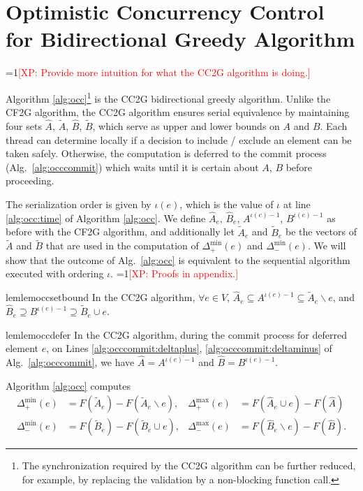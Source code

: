 \documentclass{article} %
\newcommand{\hogwild}{CF2G}
\newcommand{\occ}{CC2G}
\newcommand{\Comments}{1}
\newcommand{\note}[2]{\ifnum\Comments=1\textcolor{#1}{#2}\fi}
\newcommand{\xinghao}[1]{\note{red}{[XP: #1]}}
\newcommand{\algref}[1]{Alg.~\ref{#1}}
\begin{document}
\section{Optimistic Concurrency Control for Bidirectional Greedy Algorithm}
\xinghao{Provide more intuition for what the \occ{} algorithm is doing.}

Algorithm \ref{alg:occ}\footnote{The synchronization required by the \occ{} algorithm can be further reduced, for example, by replacing the validation by a non-blocking function call.} is the \occ{} bidirectional greedy algorithm.
Unlike the \hogwild{} algorithm, the \occ{} algorithm ensures serial equivalence by maintaining four sets $\hat{A}$, $\tilde{A}$, $\hat{B}$, $\tilde{B}$, which serve as upper and lower bounds on $A$ and $B$.
Each thread can determine locally if a decision to include / exclude an element can be taken safely.
Otherwise, the computation is deferred to the commit process (\algref{alg:occcommit}) which waits until it is certain about $A$, $B$ before proceeding.

The serialization order is given by $\iota(e)$, which is the value of $\iota$ at line \ref{alg:occ:time} of Algorithm \ref{alg:occ}.
We define $\hat{A}_e$, $\hat{B}_e$, $A^{\iota(e)-1}$, $B^{\iota(e)-1}$ as before with the \hogwild{} algorithm, and additionally let $\tilde{A}_e$ and $\tilde{B}_e$ be the vectors of $\tilde{A}$ and $\tilde{B}$ that are used in the computation of $\Delta_+^{\min}(e)$ and $\Delta_-^{\min}(e)$.
We will show that the outcome of \algref{alg:occ} is equivalent to the sequential algorithm executed with ordering $\iota$.
\xinghao{Proofs in appendix.}

\begin{restatable}{lem}{lemoccsetbound}\label{lem:occ:set_bound}
In the \occ{} algorithm, $\forall e\in V$,
$\hat{A}_e \subseteq A^{\iota(e)-1} \subseteq \tilde{A}_e \backslash e$, and $\hat{B}_e \supseteq B^{\iota(e)-1} \supseteq \tilde{B}_e \cup e$.
\end{restatable}

\begin{restatable}{lem}{lemoccdefer}\label{lem:occ:defer}
In the \occ{} algorithm, during the commit process for deferred element $e$, on Lines \ref{alg:occcommit:deltaplus}, \ref{alg:occcommit:deltaminus} of \algref{alg:occcommit}, we have $\hat{A} = A^{\iota(e)-1}$ and $\hat{B} = B^{\iota(e)-1}$.
\end{restatable}

Algorithm \ref{alg:occ} computes
\begin{align*}
  \Delta_+^{\min}(e) &= F(\tilde{A}_e) - F(\tilde{A}_e \backslash e),
& \Delta_+^{\max}(e) &= F(\hat{A}_e \cup e) - F(\hat{A})\\
  \Delta_-^{\min}(e) &= F(\tilde{B}_e) - F(\tilde{B}_e \cup e),
& \Delta_-^{\max}(e) &= F(\hat{B}_e \backslash e) - F(\hat{B}).
\end{align*}
\end{document}
